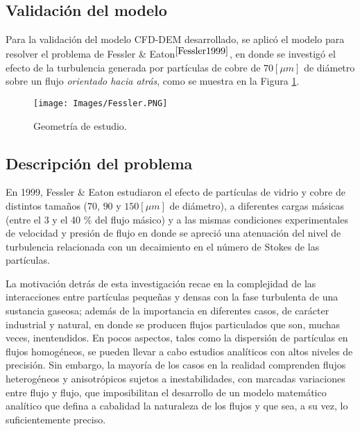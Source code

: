 \begin{center}
    \section{Validaci\'on del modelo} \label{validacion}
\end{center}

\noindent
\justify

Para la validaci\'on del modelo CFD-DEM desarrollado, se aplic\'o el modelo para resolver el problema de Fessler \& Eaton$^{\cite{Fessler1999}}$, en donde se investig\'o el efecto de la turbulencia generada por part\'iculas de cobre de $70 [\mu m]$ de di\'ametro sobre un flujo \textit{orientado hacia atr\'as}, como se muestra en la Figura \ref{problemaVal}.

\begin{figure}[h!]
    \centering
    \texttt{[image: Images/Fessler.PNG]}
    \caption{Geometr\'ia de estudio.}
    \label{problemaVal}
\end{figure}

\subsection{Descripci\'on del problema}

\noindent
\justify

En 1999, Fessler \& Eaton estudiaron el efecto de part\'iculas de vidrio y cobre de distintos tama\~nos ($70$, $90$ y $150 [\mu m]$ de di\'ametro), a diferentes cargas m\'asicas (entre el 3 y el 40 \% del flujo m\'asico) y a las mismas condiciones experimentales de velocidad y presi\'on de flujo en donde se apreci\'o una atenuaci\'on del nivel de turbulencia relacionada con un decaimiento en el n\'umero de Stokes de las part\'iculas.

\noindent
\justify

La motivaci\'on detr\'as de esta investigaci\'on recae en la complejidad de las interacciones entre part\'iculas peque\~nas y densas con la fase turbulenta de una sustancia gaseosa; adem\'as de la importancia en diferentes casos, de car\'acter industrial y natural, en donde se producen flujos particulados que son, muchas veces, inentendidos. En pocos aspectos, tales como la dispersi\'on de part\'iculas en flujos homog\'eneos, se pueden llevar a cabo estudios anal\'iticos con altos niveles de precisi\'on. Sin embargo, la mayor\'ia de los casos en la realidad comprenden flujos heterog\'eneos y anisotr\'opicos sujetos a inestabilidades, con marcadas variaciones entre flujo y flujo, que imposibilitan el desarrollo de un modelo matem\'atico anal\'itico que defina a cabalidad la naturaleza de los flujos y que sea, a su vez, lo suficientemente preciso. 

